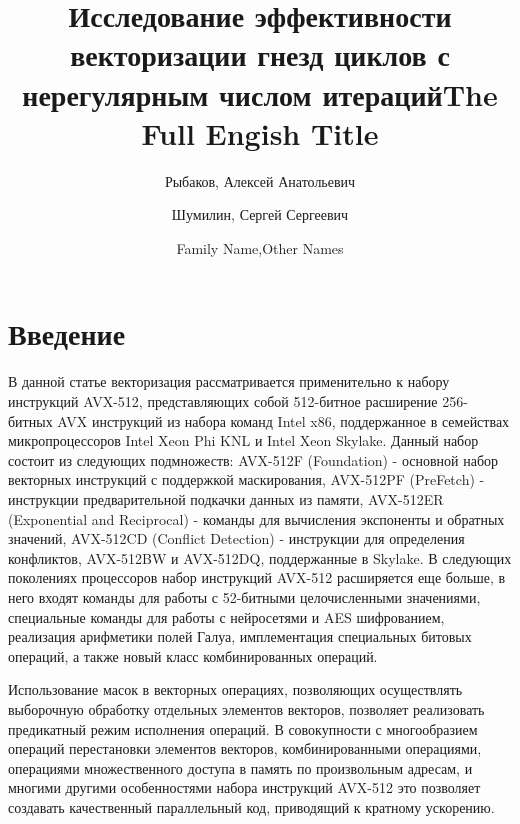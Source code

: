 \documentclass[utf8]{psta}
\title[исследование эффективности векторизации]{Исследование эффективности векторизации гнезд циклов с нерегулярным числом итераций}
\author{Рыбаков, Алексей Анатольевич}
\author{Шумилин, Сергей Сергеевич}
\title[Short title]{The Full Engish Title}
\author{Family Name,Other Names}
\begin{document}
           
\maketitle   

\section*{Введение}

В данной статье векторизация рассматривается применительно к набору инструкций AVX-512, представляющих собой 512-битное расширение 256-битных AVX инструкций из набора команд Intel x86, поддержанное в семействах микропроцессоров Intel Xeon Phi KNL и Intel Xeon Skylake. Данный набор состоит из следующих подмножеств: AVX-512F (Foundation) - основной набор векторных инструкций с поддержкой маскирования, AVX-512PF (PreFetch) - инструкции предварительной подкачки данных из памяти, AVX-512ER (Exponential and Reciprocal) - команды для вычисления экспоненты и обратных значений, AVX-512CD (Conflict Detection) - инструкции для определения конфликтов, AVX-512BW и AVX-512DQ, поддержанные в Skylake. В следующих поколениях процессоров набор инструкций AVX-512 расширяется еще больше, в него входят команды для работы с 52-битными целочисленными значениями, специальные команды для работы с нейросетями и AES шифрованием, реализация арифметики полей Галуа, имплементация специальных битовых операций, а также новый класс комбинированных операций.

Использование масок в векторных операциях, позволяющих осуществлять выборочную обработку отдельных элементов векторов, позволяет реализовать предикатный режим исполнения операций. В совокупности с многообразием операций перестановки элементов векторов, комбинированными операциями, операциями множественного доступа в память по произвольным адресам, и многими другими особенностями набора инструкций AVX-512 это позволяет создавать качественный параллельный код, приводящий к кратному ускорению.
\end{document}
